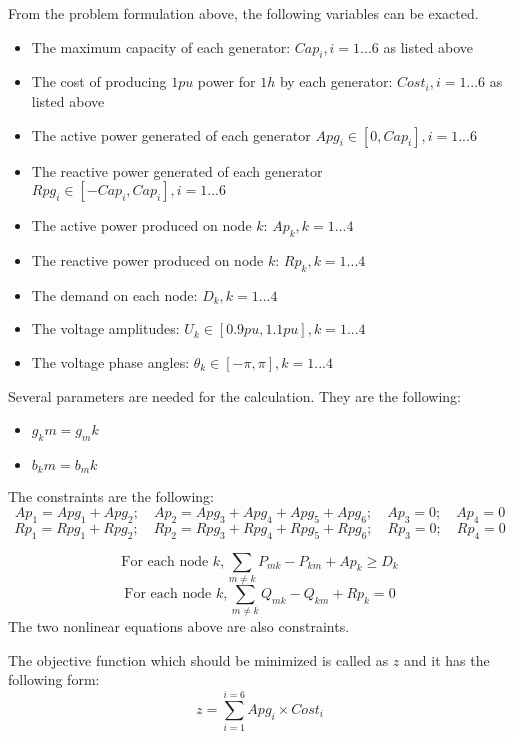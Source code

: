 From the problem formulation above, the following variables can be exacted. 
\begin{itemize}[noitemsep]
\item The maximum capacity of each generator: $Cap_i, i = 1...6$ as listed above
\item The cost of producing $1 pu$ power for $1 h$ by each generator: $Cost_i, i = 1...6$ as listed above
\item The active power generated of each generator $Apg_i \in [0, Cap_i], i = 1...6$
\item The reactive power generated of each generator $Rpg_i \in [-Cap_i, Cap_i], i = 1...6$
\item The active power produced on node $k$: $Ap_k, k = 1...4$
\item The reactive power produced on node $k$: $Rp_k, k = 1...4$
\item The demand on each node: $D_k, k = 1...4$
\item The voltage amplitudes: $U_k \in [0.9pu, 1.1pu], k=1...4$
\item The voltage phase angles: $\theta_k \in [-\pi, \pi], k=1...4$
\end{itemize}


Several parameters are needed for the calculation. They are the following:
\begin{itemize}[noitemsep]
\item $g_km = g_mk$
\item $b_km = b_mk$
\end{itemize}


The constraints are the following:
\[
Ap_1 = Apg_1 + Apg_2;\quad Ap_2 = Apg_3 + Apg_4 + Apg_5 + Apg_6;\quad Ap_3 = 0;\quad Ap_4 = 0
\]
\[
Rp_1 = Rpg_1 + Rpg_2;\quad Rp_2 = Rpg_3 + Rpg_4 + Rpg_5 + Rpg_6;\quad Rp_3 = 0;\quad Rp_4 = 0
\]

\[
\textrm{For each node } k, \sum_{m \neq k} P_{mk} - P_{km} + Ap_k \geq D_k
\]
\[
\textrm{For each node } k, \sum_{m \neq k} Q_{mk} - Q_{km} + Rp_k = 0
\]
The two nonlinear equations above are also constraints. 

The objective function which should be minimized is called as $z$ and it has the following form:
\[
z = \sum_{i=1}^{i=6} Apg_i \times Cost_i
\]